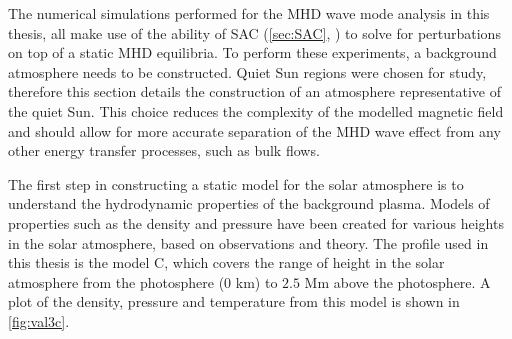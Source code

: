 The numerical simulations performed for the MHD wave mode analysis in this thesis, all make use of the ability of SAC (\cref{sec:SAC}, \cite{shelyag2008}) to solve for perturbations on top of a static MHD equilibria.
To perform these experiments, a background atmosphere needs to be constructed.
Quiet Sun regions were chosen for study, therefore this section details the construction of an atmosphere representative of the quiet Sun.
This choice reduces the complexity of the modelled magnetic field and should allow for more accurate separation of the MHD wave effect from any other energy transfer processes, such as bulk flows.

The first step in constructing a static model for the solar atmosphere is to understand the hydrodynamic properties of the background plasma.
Models of properties such as the density and pressure have been created for various heights in the solar atmosphere, based on observations and theory.
The profile used in this thesis is the \cite{vernazza1981} model C, which covers the range of height in the solar atmosphere from the photosphere ($0$ km) to $2.5$ Mm above the photosphere.
A plot of the density, pressure and temperature from this model is shown in \cref{fig:val3c}.

